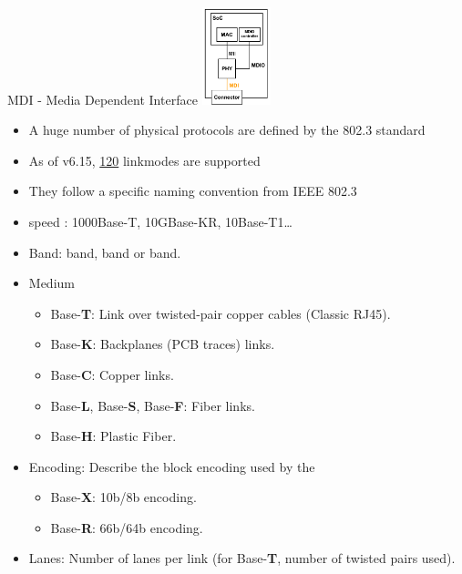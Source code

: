 \begin{frame}{MDI - Media Dependent Interface}
	\vspace{3cm}
	\hfill
	\includegraphics[width=0.15\textwidth]{slides/networking-driver-phy/mdi.pdf}
	\vspace{-6cm} %
	\begin{itemize}
		\item A huge number of physical protocols are defined by the 802.3 standard 
		\item As of v6.15, \href{https://elixir.bootlin.com/linux/v6.15.1/source/include/uapi/linux/ethtool.h\#L1950}{120} linkmodes are supported
		\item They follow a specific naming convention from IEEE 802.3
			    \item
{\color{blue}speed}
: {\color{blue}1000}Base-{\color{violet}T},
{\color{blue}10G}Base-{\color{violet}K}{\color{red}R},
{\color{blue}10}Base-{\color{violet}T}{\color{orange}1}\dots
  \end{itemize}

  \begin{itemize}
    \item Band: band, band or band.
    \item {\color{violet}Medium}
      \begin{itemize}
        \item Base-\textbf{T}: Link over twisted-pair copper cables
(Classic RJ45).
	\item Base-\textbf{K}: Backplanes (PCB traces) links.
	\item Base-\textbf{C}: Copper links.
	\item Base-\textbf{L}, Base-\textbf{S}, Base-\textbf{F}: Fiber
        links.
	\item Base-\textbf{H}: Plastic Fiber.
      \end{itemize}
    \item {\color{red}Encoding}: Describe the block encoding used by the 
      \begin{itemize}
        \item Base-\textbf{X}: 10b/8b encoding.
	\item Base-\textbf{R}: 66b/64b encoding.
      \end{itemize}
    \item {\color{orange}Lanes}: Number of lanes per link (for
    Base-\textbf{T}, number of twisted pairs used).
	\end{itemize}
\end{frame}

